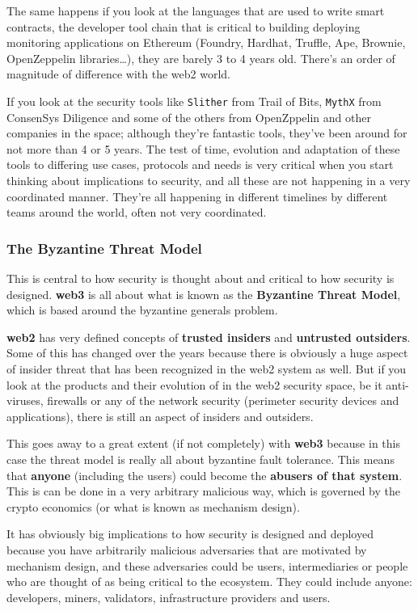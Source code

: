 The same happens if you look at the languages that are used to write
smart contracts, the developer tool chain that is critical to building
deploying monitoring applications on Ethereum (Foundry, Hardhat,
Truffle, Ape, Brownie, OpenZeppelin libraries\ldots), they are barely 3
to 4 years old. There's an order of magnitude of difference with the
web2 world.

If you look at the security tools like \texttt{Slither} from Trail of
Bits, \texttt{MythX} from ConsenSys Diligence and some of the others
from OpenZppelin and other companies in the space; although they're
fantastic tools, they've been around for not more than 4 or 5 years. The
test of time, evolution and adaptation of these tools to differing use
cases, protocols and needs is very critical when you start thinking
about implications to security, and all these are not happening in a
very coordinated manner. They're all happening in different timelines by
different teams around the world, often not very coordinated.

\subsubsection{The Byzantine Threat
Model}\label{the-byzantine-threat-model}

This is central to how security is thought about and critical to how
security is designed. \textbf{web3} is all about what is known as the
\textbf{Byzantine Threat Model}, which is based around the byzantine
generals problem.

\textbf{web2} has very defined concepts of \textbf{trusted insiders} and
\textbf{untrusted outsiders}. Some of this has changed over the years
because there is obviously a huge aspect of insider threat that has been
recognized in the web2 system as well. But if you look at the products
and their evolution of in the web2 security space, be it anti-viruses,
firewalls or any of the network security (perimeter security devices and
applications), there is still an aspect of insiders and outsiders.

This goes away to a great extent (if not completely) with \textbf{web3}
because in this case the threat model is really all about byzantine
fault tolerance. This means that \textbf{anyone} (including the users)
could become the \textbf{abusers of that system}. This is can be done in
a very arbitrary malicious way, which is governed by the crypto
economics (or what is known as mechanism design).

It has obviously big implications to how security is designed and
deployed because you have arbitrarily malicious adversaries that are
motivated by mechanism design, and these adversaries could be users,
intermediaries or people who are thought of as being critical to the
ecosystem. They could include anyone: developers, miners, validators,
infrastructure providers and users.

